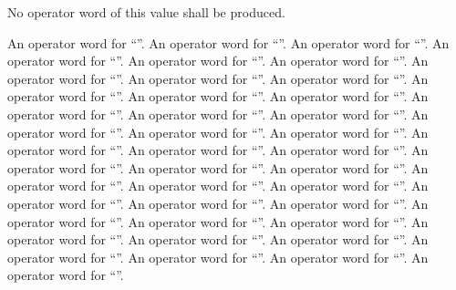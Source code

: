 No operator word of this value shall be produced.

 An operator word for ``\code{=}''.
  An operator word for ``\code{,}''.
   An operator word for ``\code{!}''.
   An operator word for ``\code{+}''.
   An operator word for ``\code{-}''.
   An operator word for ``\code{*}''.
   An operator word for ``\code{/}''.
   An operator word for ``\code{\%}''.
   An operator word for ``\code{<<}''.
   An operator word for ``\code{>>}''.
   An operator word for ``\code{\~}''.
   An operator word for ``\code{\^}''.
   An operator word for ``\code{|}''.
   An operator word for ``\code{\&}''.
   An operator word for ``\code{++}''.
   An operator word for ``\code{--}''.
   An operator word for ``\code{<}''.
   An operator word for ``\code{<=}''.
   An operator word for ``\code{>}''.
   An operator word for ``\code{>=}''.
   An operator word for ``\code{==}''.
   An operator word for ``\code{\!=}''.
   An operator word for ``\code{<=>}''.
   An operator word for ``\code{+=}''.
   An operator word for ``\code{-=}''.
   An operator word for ``\code{*=}''.
   An operator word for ``\code{/=}''.
   An operator word for ``\code{\%=}''.
   An operator word for ``\code{\&=}''.
   An operator word for ``\code{|=}''.
   An operator word for ``\code{\^=}''.
   An operator word for ``\code{<<=}''.
   An operator word for ``\code{>>=}''.
   An operator word for ``\code{\&\&}''.
   An operator word for ``\code{||}''.
   An operator word for ``''.
   An operator word for ``''.
   An operator word for ``\code{->}''.
   An operator word for ``''.
   An operator word for ``\code{->*}''.


